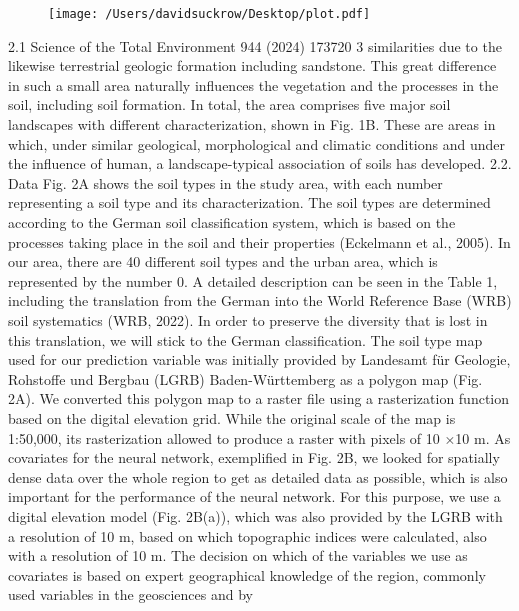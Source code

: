 \begin{figure}[h!]  %
    \centering      %
    \texttt{[image: /Users/davidsuckrow/Desktop/plot.pdf]}  %
    \label{fig:example}  %
\end{figure}
2.1
Science of the Total Environment 944 (2024) 173720
3
similarities due to the likewise terrestrial geologic formation including
sandstone. This great difference in such a small area naturally influences
the vegetation and the processes in the soil, including soil formation. In
total, the area comprises five major soil landscapes with different
characterization, shown in Fig. 1B. These are areas in which, under
similar geological, morphological and climatic conditions and under the
influence of human, a landscape-typical association of soils has
developed.
2.2. Data
Fig. 2A shows the soil types in the study area, with each number
representing a soil type and its characterization. The soil types are
determined according to the German soil classification system, which is
based on the processes taking place in the soil and their properties
(Eckelmann et al., 2005). In our area, there are 40 different soil types
and the urban area, which is represented by the number 0. A detailed
description can be seen in the Table 1, including the translation from the
German into the World Reference Base (WRB) soil systematics (WRB,
2022).
In order to preserve the diversity that is lost in this translation, we
will stick to the German classification. The soil type map used for our
prediction variable was initially provided by Landesamt für Geologie,
Rohstoffe und Bergbau (LGRB) Baden-Württemberg as a polygon map
(Fig. 2A). We converted this polygon map to a raster file using a rasterization
function based on the digital elevation grid. While the original
scale of the map is 1:50,000, its rasterization allowed to produce a raster
with pixels of 10 ×10 m. As covariates for the neural network, exemplified
in Fig. 2B, we looked for spatially dense data over the whole
region to get as detailed data as possible, which is also important for the
performance of the neural network. For this purpose, we use a digital
elevation model (Fig. 2B(a)), which was also provided by the LGRB with
a resolution of 10 m, based on which topographic indices were calculated,
also with a resolution of 10 m. The decision on which of the
variables we use as covariates is based on expert geographical knowledge
of the region, commonly used variables in the geosciences and by
